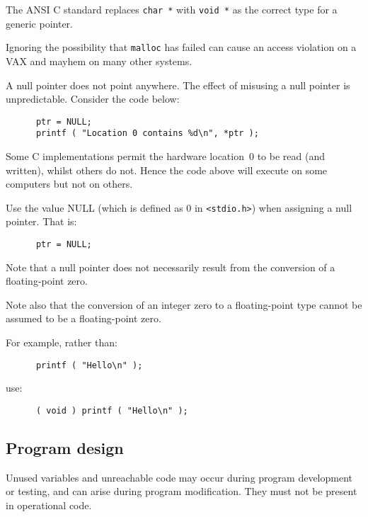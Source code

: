 The ANSI C standard replaces {\tt char~*} with {\tt void~*} as the 
correct type for a generic pointer.


Ignoring the possibility that {\tt malloc} has failed 
can cause an access violation 
on a  VAX and mayhem on many other systems.

A null pointer does not point anywhere. The effect of misusing a
null pointer is unpredictable. 
Consider the code below:
\begin{verbatim}
      ptr = NULL;
      printf ( "Location 0 contains %d\n", *ptr );
\end{verbatim}
Some C implementations permit the 
hardware location~0 to be read (and written), whilst others do not.
Hence the code above will execute on some computers but not on others.

Use the value NULL (which is defined as 0 in \verb!<stdio.h>!)
when assigning a null pointer. That is:  
\begin{verbatim}
      ptr = NULL;
\end{verbatim}
Note that a null pointer does not necessarily
result from the conversion of a floating-point zero. 

Note also that the conversion of an integer zero to a floating-point type 
cannot be assumed to be a floating-point zero.

For example, rather than:
\begin{verbatim}
      printf ( "Hello\n" );
\end{verbatim}
use:
\begin{verbatim}
      ( void ) printf ( "Hello\n" );
\end{verbatim}

\newpage
\subsection{Program design}

Unused variables and unreachable code may occur during program development or 
testing, and can arise during program modification.  They must not be present 
in operational code.

